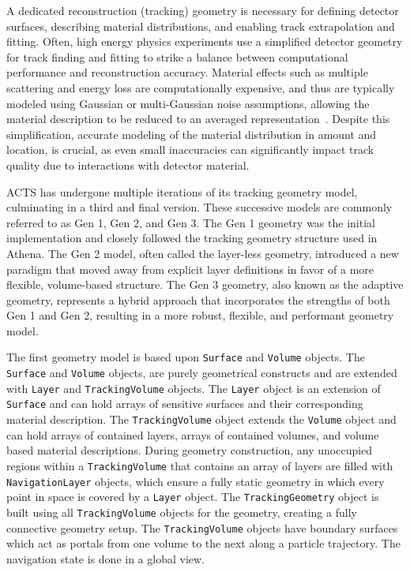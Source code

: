 A dedicated reconstruction (tracking) geometry is necessary for defining detector surfaces, describing material distributions, and enabling track extrapolation and fitting. Often, high energy physics experiments use a simplified detector geometry for track finding and fitting to strike a balance between computational performance and reconstruction accuracy. Material effects such as multiple scattering and energy loss are computationally expensive, and thus are typically modeled using Gaussian or multi-Gaussian noise assumptions, allowing the material description to be reduced to an averaged representation~\cite{Salzburger:2007rba}. Despite this simplification, accurate modeling of the material distribution in amount and location, is crucial, as even small inaccuracies can significantly impact track quality due to interactions with detector material.

ACTS has undergone multiple iterations of its tracking geometry model, culminating in a third and final version. These successive models are commonly referred to as Gen 1, Gen 2, and Gen 3. The Gen 1 geometry was the initial implementation and closely followed the tracking geometry structure used in Athena. The Gen 2 model, often called the layer-less geometry, introduced a new paradigm that moved away from explicit layer definitions in favor of a more flexible, volume-based structure. The Gen 3 geometry, also known as the adaptive geometry, represents a hybrid approach that incorporates the strengths of both Gen 1 and Gen 2, resulting in a more robust, flexible, and performant geometry model.

The first geometry model is based upon \texttt{Surface} and \texttt{Volume} objects. The \texttt{Surface} and \texttt{Volume} objects, are purely geometrical constructs and are extended with \texttt{Layer} and \texttt{TrackingVolume} objects. The \texttt{Layer} object is an extension of \texttt{Surface} and can hold arrays of sensitive surfaces and their corresponding material description. The \texttt{TrackingVolume} object extends the \texttt{Volume} object and can hold arrays of contained layers, arrays of contained volumes, and volume based material descriptions. During geometry construction, any unoccupied regions within a \texttt{TrackingVolume} that contains an array of layers are filled with \texttt{NavigationLayer} objects, which ensure a fully static geometry in which every point in space is covered by a \texttt{Layer} object. The \texttt{TrackingGeometry} object is built using all \texttt{TrackingVolume} objects for the geometry, creating a fully connective geometry setup. The \texttt{TrackingVolume} objects have boundary surfaces which act as portals from one volume to the next along a particle trajectory. The navigation state is done in a global view.

